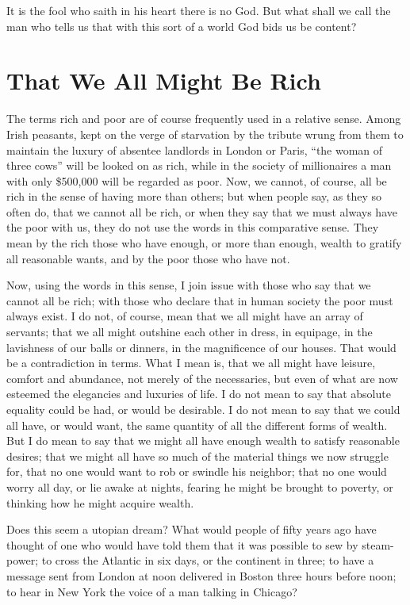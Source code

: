\documentclass{book}
\begin{document}
It is the fool who saith in his heart there is no God. But what shall we call the man who tells us that with this sort of a world God bids us be content?

\chapter{That We All Might Be Rich}
\label{chapter-8}
The terms rich and poor are of course frequently used in a relative sense. Among Irish peasants, kept on the verge of starvation by the tribute wrung from them to maintain the luxury of absentee landlords in London or Paris, “the woman of three cows” will be looked on as rich, while in the society of millionaires a man with only \$500,000 will be regarded as poor. Now, we cannot, of course, all be rich in the sense of having more than others; but when people say, as they so often do, that we cannot all be rich, or when they say that we must always have the poor with us, they do not use the words in this comparative sense. They mean by the rich those who have enough, or more than enough, wealth to gratify all reasonable wants, and by the poor those who have not.

Now, using the words in this sense, I join issue with those who say that we cannot all be rich; with those who declare that in human society the poor must always exist. I do not, of course, mean that we all might have an array of servants; that we all might outshine each other in dress, in equipage, in the lavishness of our balls or dinners, in the magnificence of our houses. That would be a contradiction in terms. What I mean is, that we all might have leisure, comfort and abundance, not merely of the necessaries, but even of what are now esteemed the elegancies and luxuries of life. I do not mean to say that absolute equality could be had, or would be desirable. I do not mean to say that we could all have, or would want, the same quantity of all the different forms of wealth. But I do mean to say that we might all have enough wealth to satisfy reasonable desires; that we might all have so much of the material things we now struggle for, that no one would want to rob or swindle his neighbor; that no one would worry all day, or lie awake at nights, fearing he might be brought to poverty, or thinking how he might acquire wealth.

Does this seem a utopian dream? What would people of fifty years ago have thought of one who would have told them that it was possible to sew by steam-power; to cross the Atlantic in six days, or the continent in three; to have a message sent from London at noon delivered in Boston three hours before noon; to hear in New York the voice of a man talking in Chicago?
\end{document}
